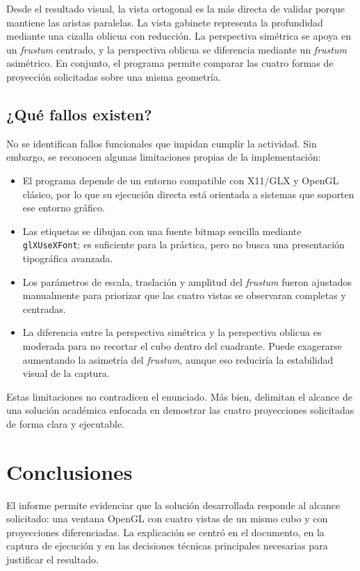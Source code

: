 \documentclass[12pt,a4paper]{article}
\begin{document}
Desde el resultado visual, la vista ortogonal es la más directa de validar porque mantiene las aristas paralelas. La vista gabinete representa la profundidad mediante una cizalla oblicua con reducción. La perspectiva simétrica se apoya en un \emph{frustum} centrado, y la perspectiva oblicua se diferencia mediante un \emph{frustum} asimétrico. En conjunto, el programa permite comparar las cuatro formas de proyección solicitadas sobre una misma geometría.

\subsection{¿Qué fallos existen?}

No se identifican fallos funcionales que impidan cumplir la actividad. Sin embargo, se reconocen algunas limitaciones propias de la implementación:

\begin{itemize}
    \item El programa depende de un entorno compatible con X11/GLX y OpenGL clásico, por lo que su ejecución directa está orientada a sistemas que soporten ese entorno gráfico.
    \item Las etiquetas se dibujan con una fuente bitmap sencilla mediante \texttt{glXUseXFont}; es suficiente para la práctica, pero no busca una presentación tipográfica avanzada.
    \item Los parámetros de escala, traslación y amplitud del \emph{frustum} fueron ajustados manualmente para priorizar que las cuatro vistas se observaran completas y centradas.
    \item La diferencia entre la perspectiva simétrica y la perspectiva oblicua es moderada para no recortar el cubo dentro del cuadrante. Puede exagerarse aumentando la asimetría del \emph{frustum}, aunque eso reduciría la estabilidad visual de la captura.
\end{itemize}

Estas limitaciones no contradicen el enunciado. Más bien, delimitan el alcance de una solución académica enfocada en demostrar las cuatro proyecciones solicitadas de forma clara y ejecutable.

\section{Conclusiones}

El informe permite evidenciar que la solución desarrollada responde al alcance solicitado: una ventana OpenGL con cuatro vistas de un mismo cubo y con proyecciones diferenciadas. La explicación se centró en el documento, en la captura de ejecución y en las decisiones técnicas principales necesarias para justificar el resultado.
\end{document}
